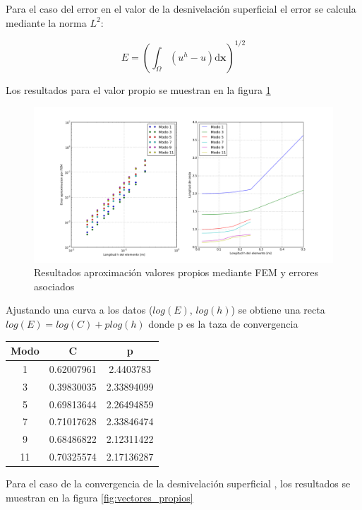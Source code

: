Para el caso del error en el valor de la desnivelaci\'on superficial el error se calcula mediante la norma $L^2$:

$$E = \left(\int_{\Omega} (u^h - u) \mathrm{d}\boldsymbol{x} \right)^{1/2}$$

Los resultados para el valor propio se muestran en la figura \ref{fig:velores_propios}

\begin{figure}
  \centering
  \includegraphics[width=17cm]{figuras/valores_propiosFEM.png}
  \caption{ Resultados aproximaci\'on valores propios mediante FEM y errores asociados}  
  \label{fig:velores_propios}
\end{figure}

Ajustando una curva a los datos ($log(E)$, $log(h)$) se obtiene una recta $log(E) = log(C) + p log(h)$ donde p es la taza de convergencia


\begin{center}
\begin{tabular}{|c|c|c|}
\hline 
Modo & C & p \\ 
\hline 
1 & 0.62007961 & 2.4403783 \\
\hline 
3 & 0.39830035 & 2.33894099 \\ 
\hline 
5 & 0.69813644 & 2.26494859 \\  
\hline 
7 & 0.71017628 & 2.33846474 \\ 
\hline 
9 & 0.68486822 & 2.12311422 \\  
\hline 
11 &  0.70325574 & 2.17136287 \\
\hline 
\end{tabular} 
\end{center}

Para el caso de la convergencia de la desnivelaci\'on superficial , los resultados se muestran en la figura \ref{fig:vectores_propios}

